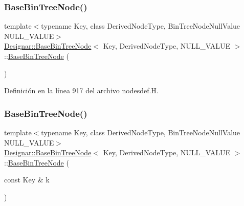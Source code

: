 \subsubsection{\texorpdfstring{Base\+Bin\+Tree\+Node()}{BaseBinTreeNode()}\hspace{0.1cm}{\footnotesize\ttfamily [1/5]}}
{\footnotesize\ttfamily template$<$typename Key, class Derived\+Node\+Type, Bin\+Tree\+Node\+Null\+Value N\+U\+L\+L\+\_\+\+V\+A\+L\+UE$>$ \\
\hyperlink{class_designar_1_1_base_bin_tree_node}{Designar\+::\+Base\+Bin\+Tree\+Node}$<$ Key, Derived\+Node\+Type, N\+U\+L\+L\+\_\+\+V\+A\+L\+UE $>$\+::\hyperlink{class_designar_1_1_base_bin_tree_node}{Base\+Bin\+Tree\+Node} (\begin{DoxyParamCaption}{ }\end{DoxyParamCaption})\hspace{0.3cm}{\ttfamily [inline]}}



Definición en la línea 917 del archivo nodesdef.\+H.

\mbox{\label{class_designar_1_1_base_bin_tree_node_a19dbfd3695d9213dc0d50a4637e92b16}} 
\subsubsection{\texorpdfstring{Base\+Bin\+Tree\+Node()}{BaseBinTreeNode()}\hspace{0.1cm}{\footnotesize\ttfamily [2/5]}}
{\footnotesize\ttfamily template$<$typename Key, class Derived\+Node\+Type, Bin\+Tree\+Node\+Null\+Value N\+U\+L\+L\+\_\+\+V\+A\+L\+UE$>$ \\
\hyperlink{class_designar_1_1_base_bin_tree_node}{Designar\+::\+Base\+Bin\+Tree\+Node}$<$ Key, Derived\+Node\+Type, N\+U\+L\+L\+\_\+\+V\+A\+L\+UE $>$\+::\hyperlink{class_designar_1_1_base_bin_tree_node}{Base\+Bin\+Tree\+Node} (\begin{DoxyParamCaption}\item[{const Key \&}]{k }\end{DoxyParamCaption})\hspace{0.3cm}{\ttfamily [inline]}}



